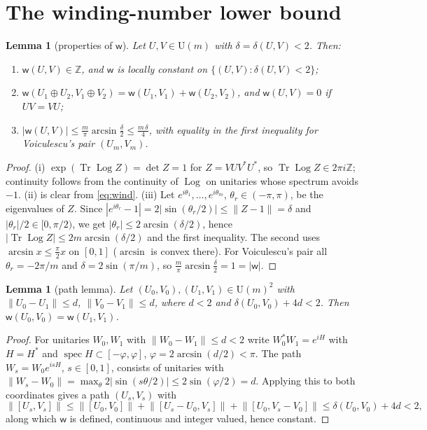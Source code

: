 \documentclass[11pt]{amsart}
\newtheorem{lemma}[theorem]{Lemma}
\theoremstyle{definition}
\theoremstyle{remark}
\newcommand{\Z}{\mathbb Z}
\newcommand{\Tr}{\operatorname{Tr}}
\newcommand{\Log}{\operatorname{Log}}
\newcommand{\wind}{\mathsf w}
\newcommand{\U}{\mathrm U}
\newcommand{\norm}[1]{\lVert #1\rVert}
\begin{document}
\section{The winding-number lower bound}\label{sec:lower}

\begin{lemma}[properties of $\wind$]\label{lem:wind}
Let $U,V\in\U(m)$ with $\delta=\delta(U,V)<2$. Then:
\begin{enumerate}[label=\textup{(\roman*)},leftmargin=2.5em]
\item $\wind(U,V)\in\Z$, and $\wind$ is locally constant on $\{(U,V):\delta(U,V)<2\}$;
\item $\wind(U_1\oplus U_2,V_1\oplus V_2)=\wind(U_1,V_1)+\wind(U_2,V_2)$, and $\wind(U,V)=0$ if $UV=VU$;
\item $\displaystyle |\wind(U,V)|\le\frac m\pi\arcsin\frac\delta2\le\frac{m\,\delta}4$, with equality in the first inequality for Voiculescu's pair $(U_m,V_m)$.
\end{enumerate}
\end{lemma}

\begin{proof}
(i) $\exp(\Tr\Log Z)=\det Z=1$ for $Z=VUV^*U^*$, so $\Tr\Log Z\in2\pi i\Z$; continuity follows from the continuity of $\Log$ on unitaries whose spectrum avoids $-1$. (ii) is clear from \eqref{eq:wind}. (iii) Let $e^{i\theta_1},\dots,e^{i\theta_m}$, $\theta_r\in(-\pi,\pi)$, be the eigenvalues of $Z$. Since $|e^{i\theta_r}-1|=2|\sin(\theta_r/2)|\le\norm{Z-1}=\delta$ and $|\theta_r|/2\in[0,\pi/2)$, we get $|\theta_r|\le2\arcsin(\delta/2)$, hence $|\Tr\Log Z|\le 2m\arcsin(\delta/2)$ and the first inequality. The second uses $\arcsin x\le\frac\pi2x$ on $[0,1]$ ($\arcsin$ is convex there). For Voiculescu's pair all $\theta_r=-2\pi/m$ and $\delta=2\sin(\pi/m)$, so $\frac m\pi\arcsin\frac\delta2=1=|\wind|$.
\end{proof}

\begin{lemma}[path lemma]\label{lem:path}
Let $(U_0,V_0),(U_1,V_1)\in\U(m)^2$ with $\norm{U_0-U_1}\le d$, $\norm{V_0-V_1}\le d$, where $d<2$ and $\delta(U_0,V_0)+4d<2$. Then $\wind(U_0,V_0)=\wind(U_1,V_1)$.
\end{lemma}

\begin{proof}
For unitaries $W_0,W_1$ with $\norm{W_0-W_1}\le d<2$ write $W_0^*W_1=e^{iH}$ with $H=H^*$ and $\operatorname{spec}H\subset[-\varphi,\varphi]$, $\varphi=2\arcsin(d/2)<\pi$. The path $W_s=W_0e^{isH}$, $s\in[0,1]$, consists of unitaries with $\norm{W_s-W_0}=\max_\theta 2|\sin(s\theta/2)|\le2\sin(\varphi/2)=d$. Applying this to both coordinates gives a path $(U_s,V_s)$ with
\[
\norm{[U_s,V_s]}\le\norm{[U_0,V_0]}+\norm{[U_s-U_0,V_s]}+\norm{[U_0,V_s-V_0]}\le\delta(U_0,V_0)+4d<2,
\]
along which $\wind$ is defined, continuous and integer valued, hence constant.
\end{proof}
\end{document}
